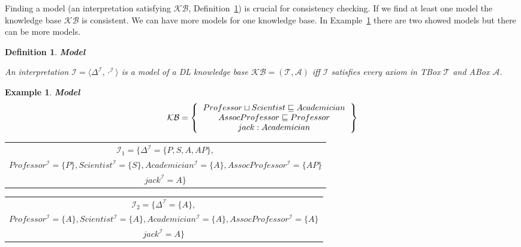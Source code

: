 \documentclass[12pt,a4paper]{article}
\newtheorem{definition}{Definition}[subsection]
\newtheorem{example}{Example}[subsection]
\begin{document}
Finding a model (an interpretation satisfying $\mathcal{KB}$, Definition~\ref{def:model}) is crucial for consistency checking. If we find at least one model the knowledge base $\mathcal{KB}$ is consistent. We can have more models for one knowledge base. In Example~\ref{example:model} there are two showed models but there can be more models. 

\begin{definition}{\textbf{Model}}
	\label{def:model}

	An interpretation $\mathcal{I} = \langle \Delta^{\mathcal{I}}, \cdot ^{\mathcal{I}}  \rangle$ is a model of a DL knowledge base $\mathcal{KB} = (\mathcal{T}, \mathcal{A})$ iff $\mathcal{I}$ satisfies every axiom in TBox $\mathcal{T}$ and ABox $\mathcal{A}$.
\end{definition}

\begin{example}{\textbf{Model}}
	\label{example:model}
	\[ 
	\mathcal{KB} = \left\{
	\begin{tabular}{c c}
	$Professor \sqcup Scientist \sqsubseteq Academician$ \\
	$AssocProfessor \sqsubseteq Professor$ \\
	$jack : Academician$ \\
	\end{tabular}
	\right \}
	\]

	\begin{table}[H]
		\centering
		\begin{tabular}{c}
			$ \mathcal{I}_{1} = \{  \Delta^{\mathcal{I}} = \{ P,S,A,AP \}, $ \\
			\addlinespace[0.4cm]
			$ Professor^{\mathcal{I}} = \{P\}, Scientist^{\mathcal{I}} = \{S\}, Academician^{\mathcal{I}} = \{A\}, AssocProfessor^{\mathcal{I}} = \{AP\} $ \\
			\addlinespace[0.4cm]
			$ jack^{\mathcal{I}} = A \} $
		\end{tabular}
	\end{table}
		
	\begin{table}[H]
		\centering
		\begin{tabular}{c}
			$ \mathcal{I}_{2} = \{  \Delta^{\mathcal{I}} = \{ A \}, $ \\
			\addlinespace[0.4cm]
			$ Professor^{\mathcal{I}} = \{A\}, Scientist^{\mathcal{I}} = \{A\}, Academician^{\mathcal{I}} = \{A\}, AssocProfessor^{\mathcal{I}} = \{A\} $ \\
			\addlinespace[0.4cm]
			$ jack^{\mathcal{I}} = A \} $
		\end{tabular}
	\end{table}

\end{example}
\end{document}
